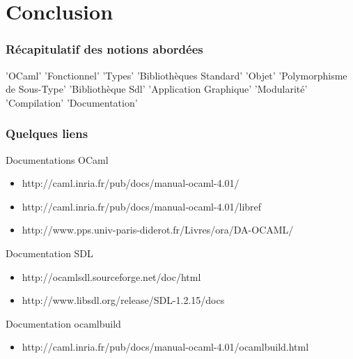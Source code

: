 \section*{Conclusion}

\begin{frame}
	\frametitle{Récapitulatif des notions abordées}
	\large
	\begin{center}
	'OCaml' 'Fonctionnel'
	'Types' 'Bibliothèques Standard' 'Objet' 'Polymorphisme de Sous-Type' 'Bibliothèque Sdl' 'Application Graphique' 'Modularité' 'Compilation'
	'Documentation'
	\end{center}
\end{frame}

\begin{frame}
	\frametitle{Quelques liens}
	\begin{block}{Documentations OCaml}
		\begin{itemize}
			\item http://caml.inria.fr/pub/docs/manual-ocaml-4.01/
			\item http://caml.inria.fr/pub/docs/manual-ocaml-4.01/libref

			\item http://www.pps.univ-paris-diderot.fr/Livres/ora/DA-OCAML/
		\end{itemize}
	\end{block}
	\begin{block}{Documentation SDL}
		\begin{itemize}
			\item http://ocamlsdl.sourceforge.net/doc/html
			\item http://www.libsdl.org/release/SDL-1.2.15/docs
		\end{itemize}
	\end{block}
	\begin{block}{Documentation ocamlbuild}
		\begin{itemize}
			\item http://caml.inria.fr/pub/docs/manual-ocaml-4.01/ocamlbuild.html 
		\end{itemize}
	\end{block}
\end{frame}
